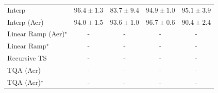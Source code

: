 \begin{tabular}{l|cccc|}
Interp & {\cellcolor[HTML]{7C2C05}} \color[HTML]{F1F1F1} $96.4\pm 1.3$ & {\cellcolor[HTML]{FED573}} \color[HTML]{000000} $83.7\pm 9.4$ & {\cellcolor[HTML]{9B3504}} \color[HTML]{F1F1F1} $94.9\pm 1.0$ & {\cellcolor[HTML]{963304}} \color[HTML]{F1F1F1} $95.1\pm 3.9$ \\
Interp (Aer) & {\cellcolor[HTML]{AE3E03}} \color[HTML]{F1F1F1} $94.0\pm 1.5$ & {\cellcolor[HTML]{B64203}} \color[HTML]{F1F1F1} $93.6\pm 1.0$ & {\cellcolor[HTML]{762A05}} \color[HTML]{F1F1F1} $96.7\pm 0.6$ & {\cellcolor[HTML]{E76B11}} \color[HTML]{F1F1F1} $90.4\pm 2.4$ \\
Linear Ramp (Aer)$^\star$ & {\cellcolor[HTML]{000000}} \color[HTML]{F1F1F1} {\cellcolor{white}} \color{black} - & {\cellcolor[HTML]{000000}} \color[HTML]{F1F1F1} {\cellcolor{white}} \color{black} - & {\cellcolor[HTML]{000000}} \color[HTML]{F1F1F1} {\cellcolor{white}} \color{black} - & {\cellcolor[HTML]{000000}} \color[HTML]{F1F1F1} {\cellcolor{white}} \color{black} - \\
Linear Ramp$^\star$ & {\cellcolor[HTML]{000000}} \color[HTML]{F1F1F1} {\cellcolor{white}} \color{black} - & {\cellcolor[HTML]{000000}} \color[HTML]{F1F1F1} {\cellcolor{white}} \color{black} - & {\cellcolor[HTML]{000000}} \color[HTML]{F1F1F1} {\cellcolor{white}} \color{black} - & {\cellcolor[HTML]{000000}} \color[HTML]{F1F1F1} {\cellcolor{white}} \color{black} - \\
Recursive TS & {\cellcolor[HTML]{000000}} \color[HTML]{F1F1F1} {\cellcolor{white}} \color{black} - & {\cellcolor[HTML]{000000}} \color[HTML]{F1F1F1} {\cellcolor{white}} \color{black} - & {\cellcolor[HTML]{000000}} \color[HTML]{F1F1F1} {\cellcolor{white}} \color{black} - & {\cellcolor[HTML]{000000}} \color[HTML]{F1F1F1} {\cellcolor{white}} \color{black} - \\
TQA (Aer) & {\cellcolor[HTML]{000000}} \color[HTML]{F1F1F1} {\cellcolor{white}} \color{black} - & {\cellcolor[HTML]{000000}} \color[HTML]{F1F1F1} {\cellcolor{white}} \color{black} - & {\cellcolor[HTML]{000000}} \color[HTML]{F1F1F1} {\cellcolor{white}} \color{black} - & {\cellcolor[HTML]{000000}} \color[HTML]{F1F1F1} {\cellcolor{white}} \color{black} - \\
TQA (Aer)$^\star$ & {\cellcolor[HTML]{000000}} \color[HTML]{F1F1F1} {\cellcolor{white}} \color{black} - & {\cellcolor[HTML]{000000}} \color[HTML]{F1F1F1} {\cellcolor{white}} \color{black} - & {\cellcolor[HTML]{000000}} \color[HTML]{F1F1F1} {\cellcolor{white}} \color{black} - & {\cellcolor[HTML]{000000}} \color[HTML]{F1F1F1} {\cellcolor{white}} \color{black} - \\

\end{tabular}
